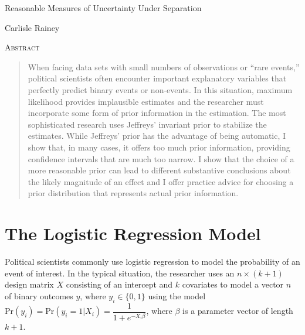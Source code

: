 \documentclass[12pt]{article}
\begin{document}
\begin{center}
{\LARGE Reasonable Measures of Uncertainty Under Separation}

\vspace{10mm}

Carlisle Rainey

\end{center}

\thispagestyle{empty}

\vspace{10mm}
{\centerline{\textsc{Abstract}}}
\begin{quote}\noindent When facing data sets with small numbers of observations or ``rare events,'' political scientists often encounter important explanatory variables that perfectly predict binary events or non-events. In this situation, maximum likelihood provides implausible estimates and the researcher must incorporate some form of prior information in the estimation. The most sophisticated research uses Jeffreys' invariant prior to stabilize the estimates. While Jeffreys' prior has the advantage of being automatic, I show that, in many cases, it offers too much prior information, providing confidence intervals that are much too narrow. I show that the choice of a more reasonable prior can lead to different substantive conclusions about the likely magnitude of an effect and I offer practice advice for choosing a prior distribution that represents actual prior information.\end{quote}


\newpage
\doublespace

\section*{The Logistic Regression Model}

Political scientists commonly use logistic regression to model the probability of an event of interest. In the typical situation, the researcher uses an $n \times (k + 1)$ design matrix $X$ consisting of an intercept and $k$ covariates to model a vector $n$ of binary outcomes $y$, where $y_i \in \{0, 1\}$ using the model $\text{Pr}(y_i) = \text{Pr}(y_i = 1 | X_i) = \dfrac{1}{1 + e^{-X_i\beta}}$, where $\beta$ is a parameter vector of length $k + 1$. 
\end{document}
